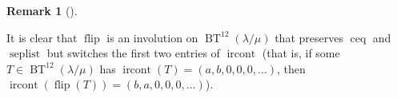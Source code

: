 \documentclass[numbers=enddot,12pt,final,onecolumn,notitlepage]{scrartcl}%
\theoremstyle{definition}
\newtheorem{remk}[theo]{Remark}
\newenvironment{remark}[1][]
{\begin{remk}[#1]\begin{leftbar}}
{\end{leftbar}\end{remk}}
\def\ircont{{\operatorname{ircont}}}
\def\BenignTables{{\operatorname{BT}^{12}\left(  \lambda/\mu\right)}}
\begin{document}
\begin{comment}
For example,
\[
\text{if } T \text { is }
\ytableausetup{notabloids}
\begin{ytableau}
\none& 1 & 1 & 2 & 1 \\
1 & 1 & 1 \\
1 & 2 & 1 \\
1 & 2 \\
2
\end{ytableau}
\text{ , then }\operatorname*{flip}\left(  T\right)\text{ is }
\ytableausetup{notabloids}
\begin{ytableau}
\none& 1 & 2 & 1 & 2 \\
1 & 1 & 2 \\
1 & 2 & 2 \\
1 & 2 \\
2
\end{ytableau}
.
\]

\end{comment}

\begin{remark}
 \label{pf.lem.BK.flip.ircont}
It is clear that $\operatorname*{flip}$ is an involution on $\BenignTables$ that preserves $\operatorname*{ceq}$ and $\operatorname*{seplist}$ but switches the first two entries of $\operatorname*{ircont}$ (that is, if some $T \in \BenignTables$ has $\ircont\left(T\right) = \left(a,b,0,0,0,\ldots\right)$, then
$\operatorname{ircont}\left(\operatorname{flip}\left(T\right)\right) = \left(b,a,0,0,0,\ldots\right)$).
\end{remark}
\end{document}
